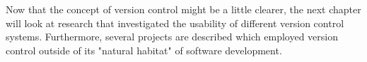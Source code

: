 Now that the concept of version control might be a little clearer, the next chapter will look at research that investigated the usability of different version control systems. Furthermore, several projects are described which employed version control outside of its "natural habitat" of software development.




